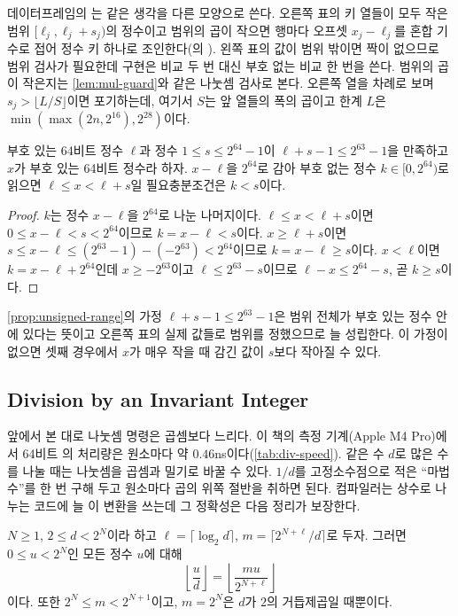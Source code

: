 데이터프레임의 는 같은 생각을 다른 모양으로 쓴다. 오른쪽 표의 키 열들이 모두 작은 범위 $[\ell_j,\ell_j+s_j)$의 정수이고 범위의 곱이 작으면 행마다 오프셋 $x_j-\ell_j$를 혼합 기수로 접어 정수 키 하나로 조인한다(의 ). 왼쪽 표의 값이 범위 밖이면 짝이 없으므로 범위 검사가 필요한데 구현은 비교 두 번 대신 부호 없는 비교 한 번을 쓴다. 범위의 곱이 작은지는 \cref{lem:mul-guard}와 같은 나눗셈 검사로 본다. 오른쪽 열을 차례로 보며 $s_j>\lfloor L/S\rfloor$이면 포기하는데, 여기서 $S$는 앞 열들의 폭의 곱이고 한계 $L$은 $\min(\max(2n,2^{16}),2^{28})$이다.

\begin{proposition}
\label{prop:unsigned-range}
부호 있는 64비트 정수 $\ell$과 정수 $1\le s\le2^{64}-1$이 $\ell+s-1\le2^{63}-1$을 만족하고 $x$가 부호 있는 64비트 정수라 하자. $x-\ell$을 $2^{64}$로 감아 부호 없는 정수 $k\in[0,2^{64})$로 읽으면 $\ell\le x<\ell+s$일 필요충분조건은 $k<s$이다.
\end{proposition}

\begin{proof}
$k$는 정수 $x-\ell$을 $2^{64}$로 나눈 나머지이다. $\ell\le x<\ell+s$이면 $0\le x-\ell<s<2^{64}$이므로 $k=x-\ell<s$이다. $x\ge\ell+s$이면 $s\le x-\ell\le(2^{63}-1)-(-2^{63})<2^{64}$이므로 $k=x-\ell\ge s$이다. $x<\ell$이면 $k=x-\ell+2^{64}$인데 $x\ge-2^{63}$이고 $\ell\le2^{63}-s$이므로 $\ell-x\le2^{64}-s$, 곧 $k\ge s$이다.
\end{proof}

\cref{prop:unsigned-range}의 가정 $\ell+s-1\le2^{63}-1$은 범위 전체가 부호 있는 정수 안에 있다는 뜻이고 오른쪽 표의 실제 값들로 범위를 정했으므로 늘 성립한다. 이 가정이 없으면 셋째 경우에서 $x$가 매우 작을 때 감긴 값이 $s$보다 작아질 수 있다.

\subsection{Division by an Invariant Integer}

앞에서 본 대로 나눗셈 명령은 곱셈보다 느리다. 이 책의 측정 기계(Apple M4 Pro)에서 64비트 의 처리량은 원소마다 약 $0.46$ns이다(\cref{tab:div-speed}). 같은 수 $d$로 많은 수를 나눌 때는 나눗셈을 곱셈과 밀기로 바꿀 수 있다. $1/d$를 고정소수점으로 적은 ``마법수''를 한 번 구해 두고 원소마다 곱의 위쪽 절반을 취하면 된다. 컴파일러는 상수로 나누는 코드에 늘 이 변환을 쓰는데 그 정확성은 다음 정리가 보장한다\cite{granlund1994division}.

\begin{theorem}
\label{thm:magic}
$N\ge1$, $2\le d<2^N$이라 하고 $\ell=\lceil\log_2d\rceil$, $m=\lceil2^{N+\ell}/d\rceil$로 두자. 그러면 $0\le u<2^N$인 모든 정수 $u$에 대해
\[
\left\lfloor\frac{u}{d}\right\rfloor=\left\lfloor\frac{mu}{2^{N+\ell}}\right\rfloor
\]
이다. 또한 $2^N\le m<2^{N+1}$이고, $m=2^N$은 $d$가 $2$의 거듭제곱일 때뿐이다.
\end{theorem}

